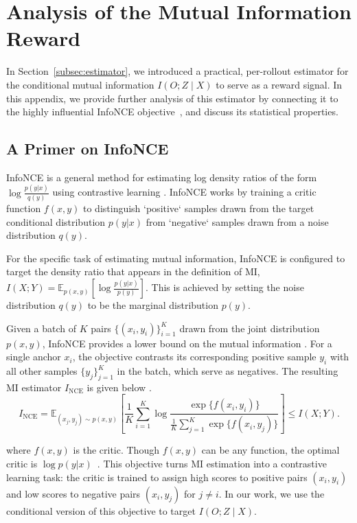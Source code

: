 \documentclass{article}
\theoremstyle{plain}
\begin{document}
\clearpage
\section{Analysis of the Mutual Information Reward}
\label{appx:mi-estimator-analysis}

In Section~\ref{subsec:estimator}, we introduced a practical, per-rollout estimator for the conditional mutual information $I(O;Z \mid X)$ to serve as a reward signal.
In this appendix, we provide further analysis of this estimator by connecting it to the highly influential InfoNCE objective~\citep{oord2018representation}, and discuss its statistical properties.

\subsection{A Primer on InfoNCE}
InfoNCE is a general method for estimating log density ratios of the form $\log \frac{p(y|x)}{q(y)}$ using contrastive learning \citep{oord2018representation}.
InfoNCE works by training a critic function $f(x,y)$ to distinguish `positive` samples drawn from the target conditional distribution $p(y|x)$ from `negative` samples drawn from a noise distribution $q(y)$.

For the specific task of estimating mutual information, InfoNCE is configured to target the density ratio that appears in the definition of MI, $I(X;Y) = \mathbb{E}_{p(x,y)}[\log \frac{p(y|x)}{p(y)}]$. This is achieved by setting the noise distribution $q(y)$ to be the marginal distribution $p(y)$.

Given a batch of $K$ pairs $\{(x_i, y_i)\}_{i=1}^K$ drawn from the joint distribution $p(x,y)$, InfoNCE provides a lower bound on the mutual information \citep{oord2018representation,poole2019variational}.
For a single anchor $x_i$, the objective contrasts its corresponding positive sample $y_i$ with all other samples $\{y_j\}_{j=1}^K$ in the batch, which serve as negatives.
The resulting MI estimator $I_\text{NCE}$ is given below \citep[for derivation, see][Section 2.3]{poole2019variational}.
\begin{equation}
    I_\text{NCE} = \mathbb{E}_{(x_j,y_j)\sim p(x,y)}\left[\frac{1}{K}\sum_{i=1}^K \log \frac{\exp\{f(x_i,y_i)\}}{\frac{1}{K}\sum_{j=1}^K \exp\{f(x_i,y_j)\}}\right] \le I(X;Y).
\end{equation}

where $f(x,y)$ is the critic.
Though \(f(x,y)\) can be any function,
the optimal critic is $\log p(y|x)$~\citep{poole2019variational}.
This objective turns MI estimation into a contrastive learning task: the critic is trained to assign high scores to positive pairs $(x_i, y_i)$ and low scores to negative pairs $(x_i, y_j)$ for $j \neq i$.
In our work, we use the conditional version of this objective to target $I(O;Z \mid X)$.
\end{document}
